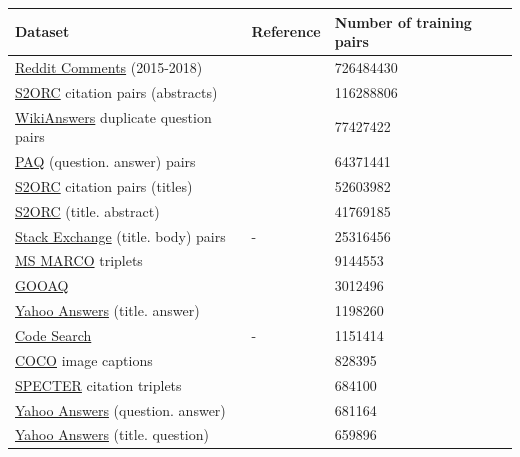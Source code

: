 \begin{table}[!htb]
\centering
\footnotesize
\begin{tabularx}{16cm}{@{}lp{4.5cm}Y@{} }
\toprule
\textbf{Dataset} & \textbf{Reference} & \textbf{Number of training pairs} \\
\midrule
\midrule 
\href{https://github.com/PolyAI-LDN/conversational-datasets/tree/master/reddit}{Reddit Comments} (2015-2018) & \textcite{henderson_19} & \num{726484430} \\
\href{https://github.com/allenai/s2orc}{S2ORC} citation pairs (abstracts) & \textcite{lo_20} & \num{116288806} \\
\href{https://github.com/afader/oqa\#wikianswers-corpus}{WikiAnswers} duplicate question pairs & \textcite{fader_14} & \num{77427422} \\
\href{https://github.com/facebookresearch/PAQ}{PAQ} (question. answer) pairs & \textcite{lewis_21} & \num{64371441} \\
\href{https://github.com/allenai/s2orc}{S2ORC} citation pairs (titles) & \textcite{lo_20} & \num{52603982} \\
\href{https://github.com/allenai/s2orc}{S2ORC} (title. abstract) & \textcite{lo_20} & \num{41769185} \\
\href{https://huggingface.co/datasets/flax-sentence-embeddings/stackexchange_xml}{Stack Exchange} (title. body) pairs & - & \num{25316456} \\
\href{https://microsoft.github.io/msmarco/}{MS MARCO} triplets & \textcite{craswell_21} & \num{9144553} \\
\href{https://github.com/allenai/gooaq}{GOOAQ} & \textcite{khashabi_21} & \num{3012496} \\
\href{https://www.kaggle.com/soumikrakshit/yahoo-answers-dataset}{Yahoo Answers} (title. answer) & \textcite{zhang_15} & \num{1198260} \\
\href{https://huggingface.co/datasets/code_search_net}{Code Search} & - & \num{1151414} \\
\href{https://cocodataset.org/\#home}{COCO} image captions & \textcite{lin_14} & \num{828395} \\
\href{https://github.com/allenai/specter}{SPECTER} citation triplets & \textcite{cohan_20} & \num{684100} \\
\href{https://www.kaggle.com/soumikrakshit/yahoo-answers-dataset}{Yahoo Answers} (question. answer) & \textcite{zhang_15} & \num{681164} \\
\href{https://www.kaggle.com/soumikrakshit/yahoo-answers-dataset}{Yahoo Answers} (title. question) & \textcite{zhang_15} & \num{659896} \\

\end{tabularx}
\end{table}
